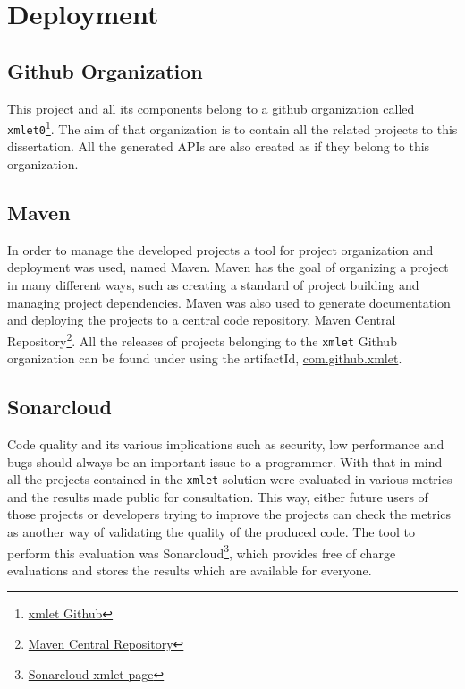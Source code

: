 \chapter{Deployment}
\label{cha:deployment}

\section{Github Organization} %
\label{sec:github}

This project and all its components belong to a github organization called \texttt{xmlet0}\footnote{\href{https://github.com/xmlet}{xmlet Github}}. The aim of that organization is to contain all the related projects to this dissertation. All the generated \ac{API}s are also created as if they belong to this organization. 

\section{Maven} %
\label{sec:maven}

In order to manage the developed projects a tool for project organization and deployment was used, named Maven. Maven has the goal of organizing a project in many different ways, such as creating a standard of project building and managing project dependencies. Maven was also used to generate documentation and deploying the projects to a central code repository, Maven Central Repository\footnote{\href{https://search.maven.org/}{Maven Central Repository}}. All the releases of projects belonging to the \texttt{xmlet} Github organization can be found under using the artifactId, \href{https://search.maven.org/#search%7Cga%7C1%7Ccom.github.xmlet}{com.github.xmlet}. 

\section{Sonarcloud} %
\label{sec:sonarcloud}

Code quality and its various implications such as security, low performance and bugs should always be an important issue to a programmer. With that in mind all the projects contained in the \texttt{xmlet} solution were evaluated in various metrics and the results made public for consultation. This way, either future users of those projects or developers trying to improve the projects can check the metrics as another way of validating the quality of the produced code. The tool to perform this evaluation was Sonarcloud\footnote{\href{https://sonarcloud.io/organizations/xmlet/projects}{Sonarcloud xmlet page}}, which provides free of charge evaluations and stores the results which are available for everyone.

